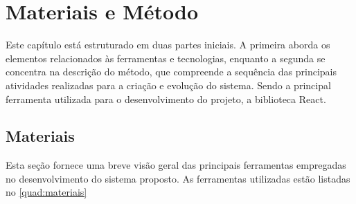 
\chapter{Materiais e Método}\label{cap:materialemetodos}

Este capítulo está estruturado em duas partes iniciais. A primeira aborda os elementos relacionados às ferramentas e tecnologias, enquanto a segunda se concentra na descrição do método, que compreende a sequência das principais atividades realizadas para a criação e evolução do sistema. Sendo a principal ferramenta utilizada para o desenvolvimento do projeto, a biblioteca React.

\section{Materiais}\label{sec:materiais}

Esta seção fornece uma breve visão geral das principais ferramentas empregadas no desenvolvimento do sistema proposto. As ferramentas utilizadas estão listadas no \autoref{quad:materiais}

